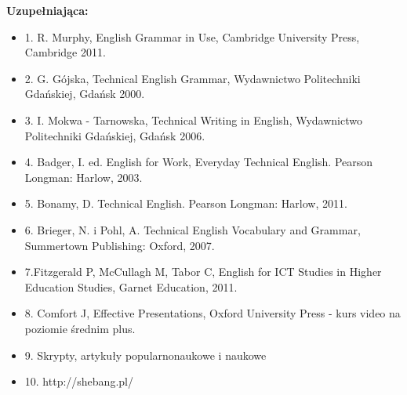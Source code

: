\documentclass[12pt, a4paper]{article}
\begin{document}
\textbf{Uzupełniająca:}
\begin{itemize}
  \item 1. R. Murphy, English Grammar in Use, Cambridge University Press, Cambridge 2011.
  \item 2. G. Gójska, Technical English Grammar, Wydawnictwo Politechniki Gdańskiej, Gdańsk 2000.
  \item 3. I. Mokwa - Tarnowska, Technical Writing in English, Wydawnictwo Politechniki Gdańskiej, Gdańsk 2006.
  \item 4. Badger, I. ed. English for Work, Everyday Technical English. Pearson Longman: Harlow, 2003.
  \item 5. Bonamy, D. Technical English. Pearson Longman: Harlow, 2011.
  \item 6. Brieger, N. i Pohl, A. Technical English Vocabulary and Grammar, Summertown Publishing: Oxford, 2007.
  \item 7.Fitzgerald P, McCullagh M, Tabor C, English for ICT Studies in Higher Education Studies, Garnet Education, 2011.
  \item 8. Comfort J, Effective Presentations, Oxford University Press - kurs video na poziomie średnim plus.
  \item 9. Skrypty, artykuły popularnonaukowe i naukowe
  \item 10. http://shebang.pl/
\end{itemize}
\end{document}
